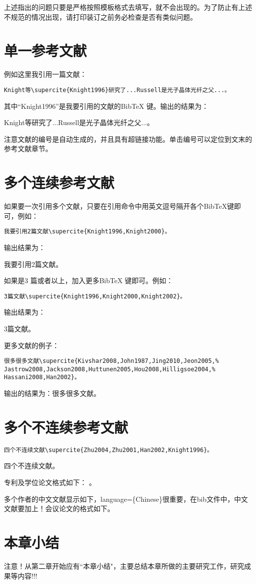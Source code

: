 上述指出的问题只要是严格按照模板格式去填写，就不会出现的。为了防止有上述不规范的情况出现，请打印装订之前务必检查是否有类似问题。


\section{单一参考文献}\label{section5-1}
例如这里我引用一篇文献：
\begin{verbatim}
Knight等\supercite{Knight1996}研究了...Russell是光子晶体光纤之父...。
\end{verbatim}
其中“Knight1996”是我要引用的文献的BibTeX 键。输出的结果为：

Knight等\supercite{Knight1996}研究了...Russell是光子晶体光纤之父...。

注意文献的编号是自动生成的，并且具有超链接功能。单击编号可以定位到文末的参考文献章节。

\section{多个连续参考文献}\label{section5-2}
 如果要一次引用多个文献，只要在引用命令中用英文逗号隔开各个BibTeX键即可，例如：
 \begin{verbatim}
我要引用2篇文献\supercite{Knight1996,Knight2000}。
\end{verbatim}
输出结果为：

我要引用2篇文献\supercite{Knight1996,Knight2000}。


如果是3 篇或者以上，加入更多BibTeX 键即可。例如：
 \begin{verbatim}
3篇文献\supercite{Knight1996,Knight2000,Knight2002}。
\end{verbatim}
输出结果为：

3篇文献\supercite{Knight1996,Knight2000,Knight2002}。

更多文献的例子：
 \begin{verbatim}
很多很多文献\supercite{Kivshar2008,John1987,Jing2010,Jeon2005,%
Jastrow2008,Jackson2008,Huttunen2005,Hou2008,Hilligsoe2004,%
Hassani2008,Han2002}。
\end{verbatim}

输出的结果为：很多很多文献\supercite{John1987,Jing2010,Jeon2005,%
Jastrow2008,Jackson2008,Huttunen2005,Hou2008,Hilligsoe2004,%
Hassani2008,Han2002}。



\section{多个不连续参考文献}\label{section5-3}
 \begin{verbatim}
四个不连续文献\supercite{Zhu2004,Zhu2001,Han2002,Knight1996}。
\end{verbatim}
四个不连续文献\supercite{Zhu2004,Zhu2001,Han2002,Knight1996}。

专利及学位论文格式如下：
\cite{jxz,Yu2004,Zhao2013}。

多个作者的中文文献显示如下\cite{yaojianquan2009}，language=\{Chinese\}很重要，在bib文件中，中文文献要加上！会议论文的格式如下\cite{Li1998}。


\section{本章小结}\label{section5-4}
注意！从第二章开始应有``本章小结"，主要总结本章所做的主要研究工作，研究成果等内容!!!
